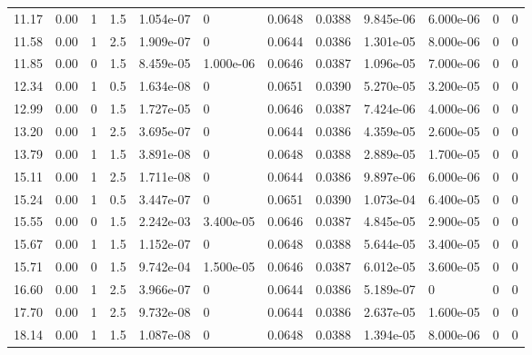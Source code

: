 \documentclass[preview]{standalone}
\begin{document}
{{\begin{tabular}{L{1.2cm}C{1.2cm} C{0.3cm}C{0.5cm} C{1.4cm}C{1.4cm} C{1.4cm}C{1.4cm} C{1.6cm}C{1.6cm} C{1.6cm}C{1.6cm}}
  11.17  &  0.00  & 1     & 1.5 &  1.054e-07  & 0  &  0.0648&   0.0388& 9.845e-06 & 6.000e-06   &  0 & 0  \\ 
  11.58  &  0.00  & 1     & 2.5 &  1.909e-07  & 0  &  0.0644&   0.0386& 1.301e-05 & 8.000e-06   &  0 & 0  \\ 
  11.85  &  0.00  & 0     & 1.5 &  8.459e-05  & 1.000e-06  &  0.0646&   0.0387& 1.096e-05 & 7.000e-06   &  0 & 0  \\ 
  12.34  &  0.00  & 1     & 0.5 &  1.634e-08  & 0  &  0.0651&   0.0390& 5.270e-05 & 3.200e-05   &  0 & 0  \\ 
  12.99  &  0.00  & 0     & 1.5 &  1.727e-05  & 0  &  0.0646&   0.0387& 7.424e-06 & 4.000e-06   &  0 & 0  \\ 
  13.20  &  0.00  & 1     & 2.5 &  3.695e-07  & 0  &  0.0644&   0.0386& 4.359e-05 & 2.600e-05   &  0 & 0  \\ 
  13.79  &  0.00  & 1     & 1.5 &  3.891e-08  & 0  &  0.0648&   0.0388& 2.889e-05 & 1.700e-05   &  0 & 0  \\ 
  15.11  &  0.00  & 1     & 2.5 &  1.711e-08  & 0  &  0.0644&   0.0386& 9.897e-06 & 6.000e-06   &  0 & 0  \\ 
  15.24  &  0.00  & 1     & 0.5 &  3.447e-07  & 0  &  0.0651&   0.0390& 1.073e-04 & 6.400e-05   &  0 & 0  \\ 
  15.55  &  0.00  & 0     & 1.5 &  2.242e-03  & 3.400e-05  &  0.0646&   0.0387& 4.845e-05 & 2.900e-05   &  0 & 0  \\ 
  15.67  &  0.00  & 1     & 1.5 &  1.152e-07  & 0  &  0.0648&   0.0388& 5.644e-05 & 3.400e-05   &  0 & 0  \\ 
  15.71  &  0.00  & 0     & 1.5 &  9.742e-04  & 1.500e-05  &  0.0646&   0.0387& 6.012e-05 & 3.600e-05   &  0 & 0  \\ 
  16.60  &  0.00  & 1     & 2.5 &  3.966e-07  & 0  &  0.0644&   0.0386& 5.189e-07 & 0   &  0 & 0  \\ 
  17.70  &  0.00  & 1     & 2.5 &  9.732e-08  & 0  &  0.0644&   0.0386& 2.637e-05 & 1.600e-05   &  0 & 0  \\ 
  18.14  &  0.00  & 1     & 1.5 &  1.087e-08  & 0  &  0.0648&   0.0388& 1.394e-05 & 8.000e-06   &  0 & 0  \\ 
\hline 
\end{tabular} 

}}
\end{document}
